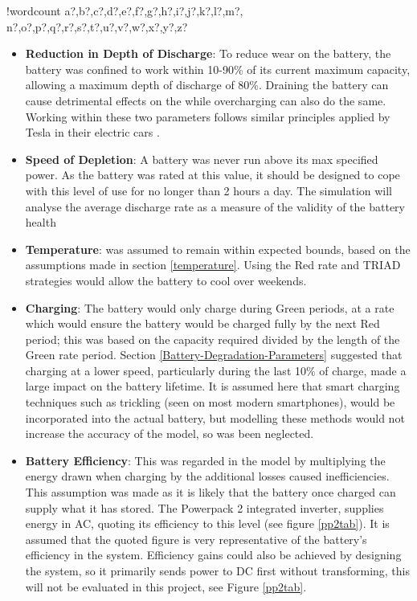 \documentclass[fontsize=9.5pt]{extarticle}
\numberwithin{figure}{section} %
\newcounter{words}
\newenvironment{counted}{%
  \setcounter{words}{0}
  \SearchList!{wordcount}{\stepcounter{words}}
    {a?,b?,c?,d?,e?,f?,g?,h?,i?,j?,k?,l?,m?,
    n?,o?,p?,q?,r?,s?,t?,u?,v?,w?,x?,y?,z?}
  \UndoBoundary{'}
  \SearchOrder{p;}}{%
  \StopSearching}
\begin{document}
\begin{counted}
\begin{itemize}
\item
  \textbf{Reduction in Depth of Discharge}: To reduce wear on the
  battery, the battery was confined to work within 10-90\% of its
  current maximum capacity, allowing a maximum depth of discharge of
  80\%. Draining the battery can cause detrimental effects on the while
  overcharging can also do the same. Working within these two parameters
  follows similar principles applied by Tesla in their electric cars
  \cite{Charging49:online}.
\item
  \textbf{Speed of Depletion}: A battery was never run above its max
  specified power. As the battery was rated at this value, it should be
  designed to cope with this level of use for no longer than 2 hours a
  day. The simulation will analyse the average discharge rate as a
  measure of the validity of the battery health
\item
  \textbf{Temperature}: was assumed to remain within expected bounds,
  based on the assumptions made in section \ref{temperature}. Using the
  Red rate and TRIAD strategies would allow the battery to cool over
  weekends.
\item
  \textbf{Charging}: The battery would only charge during Green periods,
  at a rate which would ensure the battery would be charged fully by the
  next Red period; this was based on the capacity required divided by
  the length of the Green rate period. Section
  \ref{Battery-Degradation-Parameters} suggested that charging at a
  lower speed, particularly during the last 10\% of charge, made a large
  impact on the battery lifetime. It is assumed here that smart charging
  techniques such as trickling (seen on most modern smartphones), would
  be incorporated into the actual battery, but modelling these methods
  would not increase the accuracy of the model, so was been neglected.
\item
  \textbf{Battery Efficiency}: This was regarded in the model by
  multiplying the energy drawn when charging by the additional losses
  caused inefficiencies. This assumption was made as it is likely that
  the battery once charged can supply what it has stored. The Powerpack
  2 integrated inverter, supplies energy in AC, quoting its efficiency
  to this level (see figure \ref{pp2tab}). It is assumed that the quoted
  figure is very representative of the battery's efficiency in the
  system. Efficiency gains could also be achieved by designing the
  system, so it primarily sends power to DC first without transforming,
  this will not be evaluated in this project, see Figure \ref{pp2tab}.
\end{itemize}


\end{counted}
\end{document}

